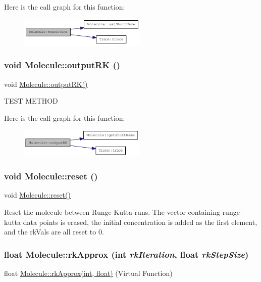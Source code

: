 Here is the call graph for this function:\nopagebreak
\begin{figure}[H]
\begin{center}
\leavevmode
\includegraphics[width=172pt]{classMolecule_af67c8a4dcbde3f500509ee1bd94ff4ef_cgraph}
\end{center}
\end{figure}
\hypertarget{classMolecule_ac6c78f4a49e270815d7e7dba311b7e14}{
\subsubsection[{outputRK}]{\setlength{\rightskip}{0pt plus 5cm}void Molecule::outputRK ()}}
\label{classMolecule_ac6c78f4a49e270815d7e7dba311b7e14}
void \hyperlink{classMolecule_ac6c78f4a49e270815d7e7dba311b7e14}{Molecule::outputRK()}

TEST METHOD 

Here is the call graph for this function:\nopagebreak
\begin{figure}[H]
\begin{center}
\leavevmode
\includegraphics[width=171pt]{classMolecule_ac6c78f4a49e270815d7e7dba311b7e14_cgraph}
\end{center}
\end{figure}
\hypertarget{classMolecule_ab073ddc977c06fe8f70b2c5108eead8c}{
\subsubsection[{reset}]{\setlength{\rightskip}{0pt plus 5cm}void Molecule::reset ()}}
\label{classMolecule_ab073ddc977c06fe8f70b2c5108eead8c}
void \hyperlink{classMolecule_ab073ddc977c06fe8f70b2c5108eead8c}{Molecule::reset()}

Reset the molecule between Runge-\/Kutta runs. The vector containing runge-\/kutta data points is erased, the initial concentration is added as the first element, and the rkVals are all reset to 0. \hypertarget{classMolecule_adabb58a65655a7f55dae0d82b65d04ba}{
\subsubsection[{rkApprox}]{\setlength{\rightskip}{0pt plus 5cm}float Molecule::rkApprox (int {\em rkIteration}, \/  float {\em rkStepSize})}}
\label{classMolecule_adabb58a65655a7f55dae0d82b65d04ba}
float \hyperlink{classMolecule_adabb58a65655a7f55dae0d82b65d04ba}{Molecule::rkApprox(int, float)} (Virtual Function)

